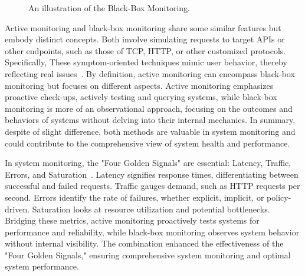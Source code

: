 \begin{figure}[htpb]
    \centering
    \caption[Black-Box Monitoring Illustration]{An illustration of the Black-Box Monitoring.}\label{fig:black-box-monitoring-illustration}
\end{figure}

Active monitoring and black-box monitoring share some similar features but embody distinct concepts. Both involve simulating requests to target \ac{API}s or other endpoints, such as those of \ac{TCP}, \ac{HTTP}, or other customized protocols. Specifically, These symptom-oriented techniques mimic user behavior, thereby reflecting real issues~\parencite{beyerSiteReliabilityEngineering2016}. By definition, active monitoring can encompass black-box monitoring but focuses on different aspects. Active monitoring emphasizes proactive check-ups, actively testing and querying systems, while black-box monitoring is more of an observational approach, focusing on the outcomes and behaviors of systems without delving into their internal mechanics. In summary, despite of slight difference, both methods are valuable in system monitoring and could contribute to the comprehensive view of system health and performance. 

In system monitoring, the "Four Golden Signals" are essential: Latency, Traffic, Errors, and Saturation~\parencite{beyerSiteReliabilityEngineering2016}. Latency signifies response times, differentiating between successful and failed requests. Traffic gauges demand, such as \ac{HTTP} requests per second. Errors identify the rate of failures, whether explicit, implicit, or policy-driven. Saturation looks at resource utilization and potential bottlenecks. Bridging these metrics, active monitoring proactively tests systems for performance and reliability, while black-box monitoring observes system behavior without internal visibility. The combination enhanced the effectiveness of the "Four Golden Signals," ensuring comprehensive system monitoring and optimal system performance.

